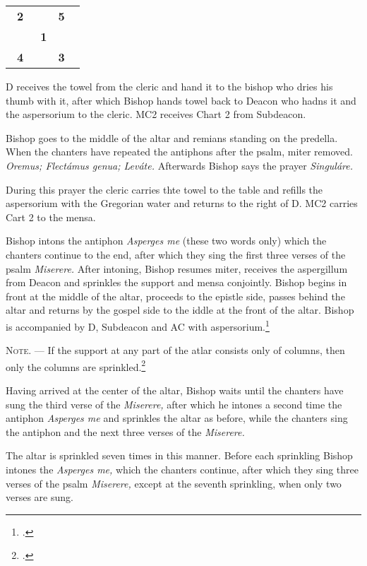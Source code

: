 \documentclass[letterpaper]{report}
\newcommand\crossplan{
\begin{center}
    \begin{tabular}{ | l c r | }
       \hline
       \cross\ \textbf{2} &                    & \textbf{5} \cross\ \\
                          & \cross\ \textbf{1} &                    \\
       \cross\ \textbf{4} &                    & \textbf{3} \cross\ \\
       \hline
   \end{tabular} 
\end{center}
}
\begin{document}
{\crossplan

D receives the towel from the cleric and hand it to the bishop who dries his
thumb with it, after which Bishop hands towel back to Deacon who hadns it and the
aspersorium to the cleric. MC2 receives Chart 2 from Subdeacon.

\rubric Bishop goes to the middle of the altar and remians standing on the predella.
When the chanters have repeated the antiphons after the psalm, miter removed.
\textit{Oremus; Flectámus genua; Leváte.} Afterwards Bishop says the prayer
\textit{Singuláre.}

During this prayer the cleric carries thte towel to the table and refills the
aspersorium with the Gregorian water and returns to the right of D. MC2 carries
Cart 2 to the mensa.

\rubric Bishop intons the antiphon \textit{Asperges me} (these two words only) which
the chanters continue to the end, after which they sing the first three verses
of the psalm \textit{Miserere.} After intoning, Bishop resumes miter, receives the
aspergillum from Deacon and sprinkles the support and mensa conjointly. Bishop begins in
front at the middle of the altar, proceeds to the epistle side, passes behind
the altar and returns by the gospel side to the iddle at the front of the
altar. Bishop is accompanied by D, Subdeacon and AC with aspersorium.\footcite[If the back
part of the altar is attached to the wall, so that the bishop cannot go around
it, he sprinkles only the \textit{base} of the base of the altar when passing
from the middle to the epistle corner, then the epistle side of the altar,
afterwards the table of the altar from the epistle corner to the gospel corner,
then the gospel side of the altar and finaly the \textit{base} in front of the
altar from the gospel corner to the middle.][footnote, p. 68.]{consecranda}

\textsc{Note. ---} If the support at any part of the atlar consists only of
columns, then only the columns are sprinkled.\footcite[][p. 68.]{consecranda}

\rubric Having arrived at the center of the altar, Bishop waits until the chanters
have sung the third verse of the \textit{Miserere,} after which he intones a
second time the antiphon \textit{Asperges me} and sprinkles the altar as
before, while the chanters sing the antiphon and the next three verses of the
\textit{Miserere.}

\rubric The altar is sprinkled seven times in this manner. Before each
sprinkling Bishop intones the \textit{Asperges me,} which the chanters continue,
after which they sing three verses of the psalm \textit{Miserere,} except at
the seventh sprinkling, when only two verses are sung.

}
\end{document}
